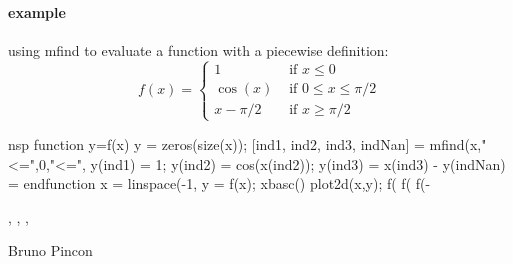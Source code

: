 \begin{examples}
  
\paragraph{example}
using mfind to evaluate a function with a piecewise definition: 
$$
f(x) = \left\{ \begin{array}{ll}
    1     & \mbox{ if } x \le 0 \\
  \cos(x) & \mbox{ if } 0 \le x \le \pi/2 \\
  x-\pi/2 & \mbox{ if } x \ge  \pi/2 
\end{array}\right.
$$
\begin{mintednsp}{nsp}
function y=f(x) 
   y = zeros(size(x)); 
   [ind1, ind2, ind3, indNan] = mfind(x,"<=",0,"<=",%
   y(ind1) = 1; 
   y(ind2) = cos(x(ind2)); 
   y(ind3) = x(ind3) - %
   y(indNan) = %
endfunction 
x = linspace(-1,%
y = f(x); 
xbasc()
plot2d(x,y); 
f(%
f(%
f(-%
\end{mintednsp}

 
\end{examples}

\begin{manseealso}
   , , , 
\end{manseealso}

\begin{authors}
  Bruno Pincon
\end{authors}
